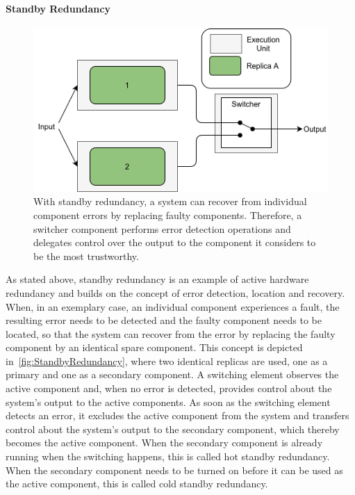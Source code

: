 \paragraph{Standby Redundancy}
\begin{figure}[!hb]
	\centering
	\includegraphics[width=0.75\linewidth]{images/ActiveSelectionRedundancy}
	\caption{With standby redundancy, a system can recover from individual component errors by replacing faulty components. Therefore, a switcher component performs error detection operations and delegates control over the output to the component it considers to be the most trustworthy.}
	\label{fig:StandbyRedundancy}
\end{figure}

As stated above, standby redundancy is an example of active hardware redundancy and builds on the concept of error detection, location and recovery.
When, in an exemplary case, an individual component experiences a fault, the resulting error needs to be detected and the faulty component needs to be located, so that the system can recover from the error by replacing the faulty component by an identical spare component.
This concept is depicted in~\autoref{fig:StandbyRedundancy}, where two identical replicas are used, one as a primary and one as a secondary component.
A switching element observes the active component and, when no error is detected, provides control about the system's output to the active components.
As soon as the switching element detects an error, it excludes the active component from the system and transfers control about the system's output to the secondary component, which thereby becomes the active component.
When the secondary component is already running when the switching happens, this is called hot standby redundancy.
When the secondary component needs to be turned on before it can be used as the active component, this is called cold standby redundancy.

